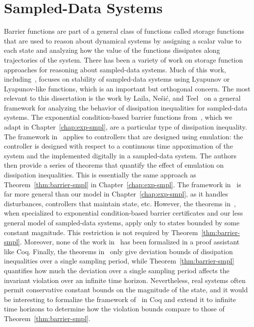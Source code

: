 \section{Sampled-Data Systems}
\label{sec:related-sampled}
Barrier functions are part of a general class of functions called storage
functions~\cite{Willems1972} that are used to reason about dynamical
systems by assigning a scalar value to each state and analyzing how the
value of the functions dissipates along trajectories of the system.  There
has been a variety of work on storage function approaches for reasoning
about sampled-data systems.  Much of this work,
including~\cite{chen1991input,seuret13sampled}, focuses on stability of
sampled-data systems using Lyapunov or Lyapunov-like functions, which is an
important but orthogonal concern. The most relevant to this dissertation is
the work by Laila, Nešić, and Teel~\cite{laila02sampled} on a general
framework for analyzing the behavior of dissipation inequalities for
sampled-data systems. The exponential condition-based barrier functions
from~\cite{kong2013barrier}, which we adapt in Chapter~\ref{chap:exp-smpl},
are a particular type of dissipation inequality. The framework
in~\cite{laila02sampled} applies to controllers that are designed using
emulation: the controller is designed with respect to a continuous time
appoximation of the system and the implemented digitally in a sampled-data
system. The authors then provide a series of theorems that quantify the
effect of emulation on dissipation inequalities. This is essentially the
same approach as Theorem~\ref{thm:barrier-smpl} in
Chapter~\ref{chap:exp-smpl}. The framework in~\cite{laila02sampled} is far
more general than our model in Chapter~\ref{chap:exp-smpl}, as it handles
disturbances, controllers that maintain state, etc. However, the theorems
in~\cite{laila02sampled}, when specialized to exponential condition-based
barrier certificates and our less general model of sampled-data systems,
apply only to states bounded by some constant magnitude. This restriction
is not required by Theorem~\ref{thm:barrier-smpl}. Moreover, none of the
work in~\cite{laila02sampled} has been formalized in a proof assistant like
Coq. Finally, the theorems in~\cite{laila02sampled} only give deviation
bounds of dissipation inequalities over a single sampling period, while
Theorem~\ref{thm:barrier-smpl} quantifies how much the deviation over a
single sampling period affects the invariant violation over an infinite
time horizon. Nevertheless, real systems often permit conservative constant
bounds on the magnitude of the state, and it would be interesting to
formalize the framework of~\cite{laila02sampled} in Coq and extend it to
infinite time horizons to determine how the violation bounds compare to
those of Theorem~\ref{thm:barrier-smpl}.

